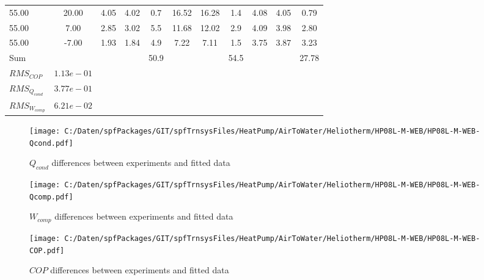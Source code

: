 \documentclass[english]{SPFShortReport}
\begin{document}
\begin{table}[!ht]
\begin{small}
\begin{center}
{\begin{tabular}{l | c c c c c c c c c c }
55.00  & 20.00 & 4.05 & 4.02 & 0.7 & 16.52 & 16.28 & 1.4 & 4.08 & 4.05 & 0.79\\ 
55.00  & 7.00 & 2.85 & 3.02 & 5.5 & 11.68 & 12.02 & 2.9 & 4.09 & 3.98 & 2.80\\ 
55.00  & -7.00 & 1.93 & 1.84 & 4.9 & 7.22 & 7.11 & 1.5 & 3.75 & 3.87 & 3.23\\ 
\hline 
 Sum &  & &  & 50.9 &  &  & 54.5 & &  & 27.78\\ 
\hline 
 $RMS_{COP}$ & $1.13e-01$ \\ 
 $RMS_{Q_{cond}}$ & $3.77e-01$ \\ 
 $RMS_{W_{comp}}$ & $6.21e-02$ \\ 
\hline
\hline
\end{tabular}
}
\label{ErrorsTable}
\end{center}
\end{small}
\end{table}
\begin{figure}[!ht]
\begin{center}
\texttt{[image: C:/Daten/spfPackages/GIT/spfTrnsysFiles/HeatPump/AirToWater/Heliotherm/HP08L-M-WEB/HP08L-M-WEB-Qcond.pdf]}
\caption{$Q_{cond}$ differences between experiments and fitted data}
\label{QcongFig}
\end{center}
\end{figure}
\begin{figure}[!ht]
\begin{center}
\texttt{[image: C:/Daten/spfPackages/GIT/spfTrnsysFiles/HeatPump/AirToWater/Heliotherm/HP08L-M-WEB/HP08L-M-WEB-Qcomp.pdf]}
\caption{$W_{comp}$ differences between experiments and fitted data}
\label{QcompFig}
\end{center}
\end{figure}
\begin{figure}[!ht]
\begin{center}
\texttt{[image: C:/Daten/spfPackages/GIT/spfTrnsysFiles/HeatPump/AirToWater/Heliotherm/HP08L-M-WEB/HP08L-M-WEB-COP.pdf]}
\caption{$COP$ differences between experiments and fitted data}
\label{COPFig}
\end{center}
\end{figure}
\end{document}
